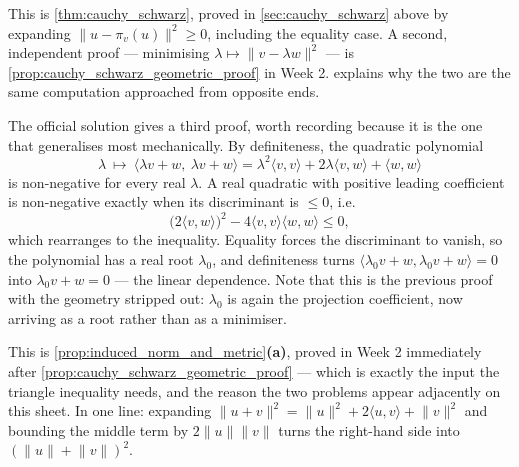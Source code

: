\begin{exercisesolution}
This is \cref{thm:cauchy_schwarz}, proved in \cref{sec:cauchy_schwarz} above by expanding
$\lVert u - \pi_v(u)\rVert^2 \geq 0$, including the equality case. A second, independent proof
--- minimising $\lambda \mapsto \lVert v-\lambda w\rVert^2$ --- is
\cref{prop:cauchy_schwarz_geometric_proof} in Week 2. 
explains why the two are the same computation approached from opposite ends.

\begin{remark}
The official solution gives a third proof, worth recording because it is the one that
generalises most mechanically. By definiteness, the quadratic polynomial
\[\lambda \ \longmapsto\ \langle \lambda v + w,\ \lambda v + w\rangle
  = \lambda^2\langle v,v\rangle + 2\lambda\langle v,w\rangle + \langle w,w\rangle\]
is non-negative for every real $\lambda$. A real quadratic with positive leading coefficient is
non-negative exactly when its discriminant is $\leq 0$, i.e.
\[\big(2\langle v,w\rangle\big)^2 - 4\langle v,v\rangle\langle w,w\rangle \leq 0,\]
which rearranges to the inequality. Equality forces the discriminant to vanish, so the
polynomial has a real root $\lambda_0$, and definiteness turns
$\langle \lambda_0 v + w, \lambda_0 v + w\rangle = 0$ into $\lambda_0 v + w = 0$ --- the linear
dependence. Note that this is the previous proof with the geometry stripped out: $\lambda_0$ is
again the projection coefficient, now arriving as a root rather than as a minimiser.
\end{remark}
\end{exercisesolution}

\begin{exercisesolution}
This is \cref{prop:induced_norm_and_metric}\textbf{(a)}, proved in Week 2 immediately after
\cref{prop:cauchy_schwarz_geometric_proof} --- which is exactly the input the triangle inequality
needs, and the reason the two problems appear adjacently on this sheet. In one line: expanding
$\lVert u+v\rVert^2 = \lVert u\rVert^2 + 2\langle u,v\rangle + \lVert v\rVert^2$ and bounding the
middle term by $2\lVert u\rVert\lVert v\rVert$ turns the right-hand side into
$(\lVert u\rVert + \lVert v\rVert)^2$.
\end{exercisesolution}

